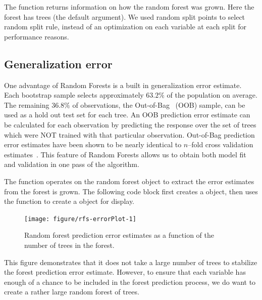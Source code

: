 \documentclass[nojss]{jss}\usepackage[]{graphicx}\usepackage[]{color}
\begin{document}
The  function returns information on how the random forest was grown. Here the  forest has  trees (the default  argument). We used  random split points to select random split rule, instead of an optimization on each variable at each split for performance reasons. 

\subsection{Generalization error}

One advantage of Random Forests is a built in generalization error estimate. Each bootstrap sample selects approximately $63.2\%$ of the population on average. The remaining $36.8\%$ of observations, the Out-of-Bag~\citep{BreimanOOB:1996e} (OOB) sample, can be used as a hold out test set for each tree. An OOB prediction error estimate can be calculated for each observation by predicting the response over the set of trees which were NOT trained with that particular observation. Out-of-Bag prediction error estimates have been shown to be nearly identical to $n$--fold cross validation estimates~\citep{StatisticalLearning:2009}. This feature of Random Forests allows us to obtain both model fit and validation in one pass of the algorithm.


The  function operates on the random forest object to extract the error estimates from the forest is grown. The following code block first creates a  object, then uses the  function to create a  object for display.

\begin{Schunk}
\begin{figure}[!htpb]

{\centering \texttt{[image: figure/rfs-errorPlot-1]} 

}

\caption[Random forest prediction error estimates as a function of the number of trees in the forest]{Random forest prediction error estimates as a function of the number of trees in the forest.\label{fig:errorPlot}}
\end{figure}
\end{Schunk}

This figure demonstrates that it does not take a large number of trees to stabilize the forest prediction error estimate. However, to ensure that each variable has enough of a chance to be included in the forest prediction process, we do want to create a rather large random forest of trees. 
\end{document}

